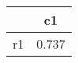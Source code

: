 \begin{table}[htbp]
\begin{tabular}{lc} \hline \hline
 & c1  \\  \hline 
r1 &     0.737 \\  
\hline \hline \end{tabular}
\end{table}
